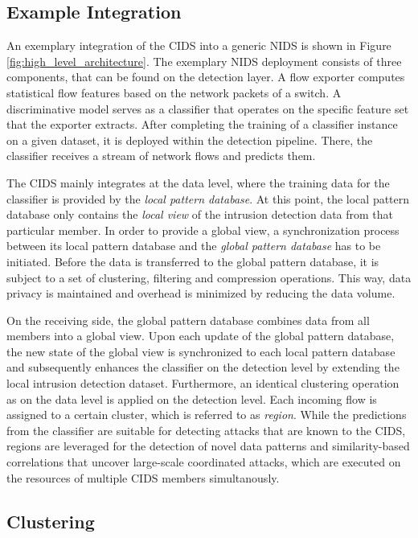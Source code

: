 \documentclass[../../main.tex]{subfiles}
\begin{document}
\subsection{Example Integration}\label{subsec:example_integration}
An exemplary integration of the CIDS into a generic NIDS is shown in Figure \ref{fig:high_level_architecture}. The exemplary NIDS deployment consists of three components, that can be found on the detection layer. A flow exporter computes statistical flow features based on the network packets of a switch. A discriminative model serves as a classifier that operates on the specific feature set that the exporter extracts. After completing the training of a classifier instance on a given dataset, it is deployed within the detection pipeline. There, the classifier receives a stream of network flows and predicts them.

The CIDS mainly integrates at the data level, where the training data for the classifier is provided by the \textit{local pattern database}. At this point, the local pattern database only contains the \textit{local view} of the intrusion detection data from that particular member. In order to provide a global view, a synchronization process between its local pattern database and the \textit{global pattern database} has to be initiated. Before the data is transferred to the global pattern database, it is subject to a set of clustering, filtering and compression operations. This way, data privacy is maintained and overhead is minimized by reducing the data volume. 

On the receiving side, the global pattern database combines data from all members into a global view. Upon each update of the global pattern database, the new state of the global view is synchronized to each local pattern database and subsequently enhances the classifier on the detection level by extending the local intrusion detection dataset. Furthermore, an identical clustering operation as on the data level is applied on the detection level. Each incoming flow is assigned to a certain cluster, which is referred to as \textit{region}. While the predictions from the classifier are suitable for detecting attacks that are known to the CIDS, regions are leveraged for the detection of novel data patterns and similarity-based correlations that uncover large-scale coordinated attacks, which are executed on the resources of multiple CIDS members simultanously.

\subsection{Clustering}\label{subsec:clustering}
\end{document}
